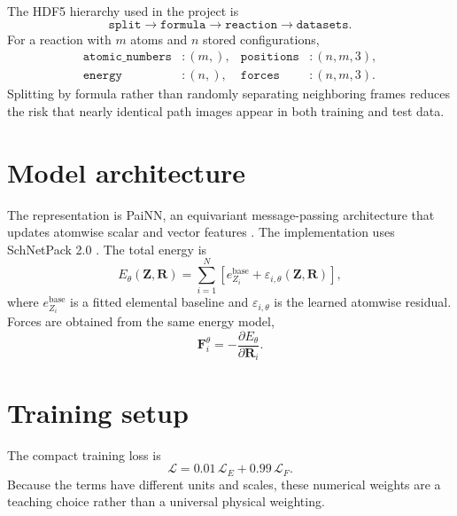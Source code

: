 \documentclass[11pt,a4paper]{article}
\begin{document}
The HDF5 hierarchy used in the project is
\begin{equation}
  \texttt{split} \rightarrow \texttt{formula} \rightarrow
  \texttt{reaction} \rightarrow \texttt{datasets}.
\end{equation}
For a reaction with $m$ atoms and $n$ stored configurations,
\begin{align}
  \texttt{atomic\_numbers} &: (m,), &
  \texttt{positions} &: (n,m,3),\\
  \texttt{energy} &: (n,), &
  \texttt{forces} &: (n,m,3).
\end{align}
Splitting by formula rather than randomly separating neighboring frames reduces the
risk that nearly identical path images appear in both training and test data.



\section{Model architecture}

The representation is PaiNN, an equivariant message-passing architecture that updates
atomwise scalar and vector features \citep{schutt2021painn}. The implementation uses
SchNetPack 2.0 \citep{schutt2023schnetpack}. The total energy is
\begin{equation}
  E_{\theta}(\bm Z,\bm R)
  = \sum_{i=1}^{N}\left[e_{Z_i}^{\mathrm{base}}
  + \varepsilon_{i,\theta}(\bm Z,\bm R)\right],
\end{equation}
where $e_{Z_i}^{\mathrm{base}}$ is a fitted elemental baseline and
$\varepsilon_{i,\theta}$ is the learned atomwise residual. Forces are obtained from
the same energy model,
\begin{equation}
  \bm F_i^{\theta} = -\frac{\partial E_{\theta}}{\partial \bm R_i}.
\end{equation}


\section{Training setup}

The compact training loss is
\begin{equation}
  \mathcal L = 0.01\,\mathcal L_E + 0.99\,\mathcal L_F.
\end{equation}
Because the terms have different units and scales, these numerical weights are a
teaching choice rather than a universal physical weighting.
\end{document}

